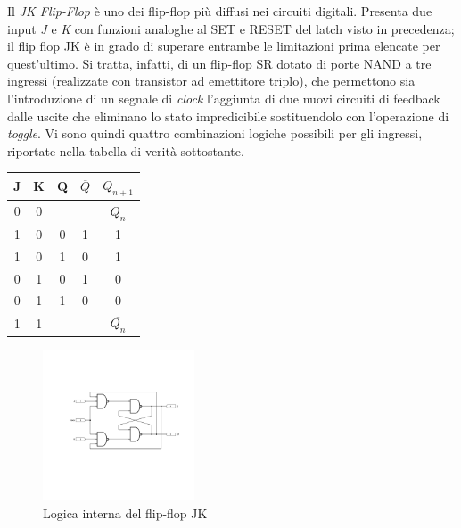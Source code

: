 \documentclass[journal]{IEEEtran}
\begin{document}
Il \textit{JK Flip-Flop} è uno dei  flip-flop più diffusi nei circuiti digitali. Presenta due input \textit{J} e \textit{K} con funzioni analoghe al SET e RESET del latch visto in precedenza; il flip flop JK è in grado di superare entrambe le limitazioni prima elencate per quest'ultimo. Si tratta, infatti, di un flip-flop SR dotato di porte NAND a tre ingressi (realizzate con transistor ad emettitore triplo), che permettono sia l'introduzione di un segnale di \textit{clock} l'aggiunta di due nuovi circuiti di feedback dalle uscite che eliminano lo stato impredicibile sostituendolo con l'operazione di \textit{toggle}. Vi sono quindi quattro combinazioni logiche possibili per gli ingressi, riportate nella tabella di verità sottostante.
\newline
\begin{center}
\begin{tabular}{ |c|c|c|c|c| } 
 \hline
 \rowcolor{lightgray}
 J & K & Q & $\overline{Q}$ & $ Q_{n + 1} $ \\ \hline \hline
 0 & 0 &  &  & $Q_n$ \\ \hline
 1 & 0 & 0 & 1 & 1 \\ \hline
 1 & 0 & 1 & 0 & 1\\ \hline
 0 & 1 & 0 & 1 & 0 \\ \hline
 0 & 1 & 1 & 0 & 0 \\ \hline
 1 & 1 &  & & $\overline{Q_n}$ \\ \hline
\end{tabular}
\end{center}

\begin{figure}[H]%
\centering
\begin{center}
\includegraphics[width=0.40\textwidth]{sch-simulations/digital/output/flip-flop-JK.pdf}
\end{center}
\caption{Logica interna del flip-flop JK}
\label{fig:circuit_JK}
\end{figure}
\end{document}

